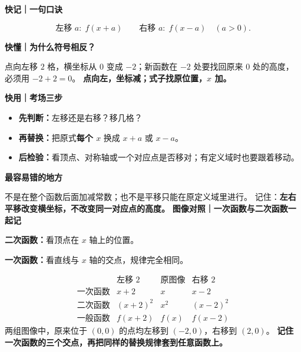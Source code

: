 \begin{summarybox}
  \textbf{\textcolor{CSummary}{快记｜一句口诀}}

  \[
    \boxed{\text{左移 }a:\;f(x+a)}
    \qquad
    \boxed{\text{右移 }a:\;f(x-a)}
    \quad (a>0).
  \]

  \textbf{\textcolor{CSummary}{快懂｜为什么符号相反？}}

  点向左移 $2$ 格，横坐标从 $0$ 变成 $-2$；新函数在 $-2$ 处要找回原来 $0$ 处的高度，必须用 $-2+2=0$。
  \textbf{点向左，坐标减；式子找原位置，$x$ 加。}

  \medskip
  \textbf{\textcolor{CSummary}{快用｜考场三步}}
  \begin{itemize}[leftmargin=*,itemsep=0.3em]
    \item \textbf{先判断：}左移还是右移？移几格？
    \item \textbf{再替换：}把原式\textbf{每个 $x$} 换成 $x+a$ 或 $x-a$。
    \item \textbf{后检验：}看顶点、对称轴或一个对应点是否移对；有定义域时也要跟着移动。
  \end{itemize}

  \textbf{\textcolor{CSummary}{最容易错的地方}}

  不是在整个函数后面加减常数；也不是平移只能在原定义域里进行。
  记住：\textbf{左右平移改变横坐标，不改变同一对应点的高度。}
  \medskip
  \textbf{\textcolor{CSummary}{图像对照｜一次函数与二次函数一起记}}

  \textbf{二次函数：}看顶点在 $x$ 轴上的位置。
  \begin{center}
    
  \end{center}

  \textbf{一次函数：}看直线与 $x$ 轴的交点，规律完全相同。
  \begin{center}
    
  \end{center}
  \[
    \begin{array}{c|ccc}
      &\text{左移 }2&\text{原图像}&\text{右移 }2\\ \hline
      \text{一次函数}&x+2&x&x-2\\
      \text{二次函数}&(x+2)^2&x^2&(x-2)^2\\
      \text{一般函数}&f(x+2)&f(x)&f(x-2)
    \end{array}
  \]
  两组图像中，原来位于 $(0,0)$ 的点均左移到 $(-2,0)$，右移到 $(2,0)$。
  \textbf{记住一次函数的三个交点，再把同样的替换规律套到任意函数上。}


\end{summarybox}

